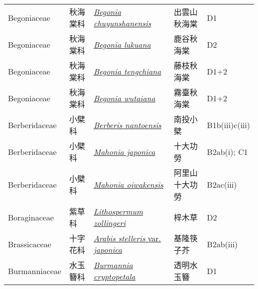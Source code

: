 {\begin{longtable}{p{2.5cm}p{2cm}p{5cm}p{2.5cm}p{3cm}}
    Begoniaceae & 秋海棠科 & \href{http://www.theplantlist.org/tpl1.1/search?q=Begonia+chuyunshanensis}{\textit{Begonia chuyunshanensis} } & 出雲山秋海棠 & D1 \index{Begonia@\textit{Begonia}!chuyunshanensis@\textit{chuyunshanensis}}  \index{出雲山秋海棠} \\
    Begoniaceae & 秋海棠科 & \href{http://www.theplantlist.org/tpl1.1/search?q=Begonia+lukuana}{\textit{Begonia lukuana} } & 鹿谷秋海棠 & D2 \index{Begonia@\textit{Begonia}!lukuana@\textit{lukuana}}  \index{鹿谷秋海棠} \\
    Begoniaceae & 秋海棠科 & \href{http://www.theplantlist.org/tpl1.1/search?q=Begonia+tengchiana}{\textit{Begonia tengchiana} } & 藤枝秋海棠 & D1+2 \index{Begonia@\textit{Begonia}!tengchiana@\textit{tengchiana}}  \index{藤枝秋海棠} \\
    Begoniaceae & 秋海棠科 & \href{http://www.theplantlist.org/tpl1.1/search?q=Begonia+wutaiana}{\textit{Begonia wutaiana} } & 霧臺秋海棠 & D1+2 \index{Begonia@\textit{Begonia}!wutaiana@\textit{wutaiana}}  \index{霧臺秋海棠} \\
    Berberidaceae & 小檗科 & \href{http://www.theplantlist.org/tpl1.1/search?q=Berberis+nantoensis}{\textit{Berberis nantoensis} } & 南投小檗 & B1b(iii)c(iii) \index{Berberis@\textit{Berberis}!nantoensis@\textit{nantoensis}}  \index{南投小檗} \\
    Berberidaceae & 小檗科 & \href{http://www.theplantlist.org/tpl1.1/search?q=Mahonia+japonica}{\textit{Mahonia japonica} } & 十大功勞 & B2ab(i); C1 \index{Mahonia@\textit{Mahonia}!japonica@\textit{japonica}}  \index{十大功勞} \\
    Berberidaceae & 小檗科 & \href{http://www.theplantlist.org/tpl1.1/search?q=Mahonia+oiwakensis}{\textit{Mahonia oiwakensis} } & 阿里山十大功勞 & B2ac(iii) \index{Mahonia@\textit{Mahonia}!oiwakensis@\textit{oiwakensis}}  \index{阿里山十大功勞} \\
    Boraginaceae & 紫草科 & \href{http://www.theplantlist.org/tpl1.1/search?q=Lithospermum+zollingeri}{\textit{Lithospermum zollingeri} } & 梓木草 & D2 \index{Lithospermum@\textit{Lithospermum}!zollingeri@\textit{zollingeri}}  \index{梓木草} \\
    Brassicaceae & 十字花科 & \href{http://www.theplantlist.org/tpl1.1/search?q=Arabis+stelleris+var.+japonica}{\textit{Arabis stelleris} var. \textit{japonica} } & 基隆筷子芥 & B2ab(iii) \index{Arabis@\textit{Arabis}!stelleris@\textit{stelleris}!var. japonica@var. \textit{japonica}}  \index{基隆筷子芥} \\
    Burmanniaceae & 水玉簪科 & \href{http://www.theplantlist.org/tpl1.1/search?q=Burmannia+cryptopetala}{\textit{Burmannia cryptopetala} } & 透明水玉簪 & D1 \index{Burmannia@\textit{Burmannia}!cryptopetala@\textit{cryptopetala}}  \index{透明水玉簪} \\

\end{longtable}}
